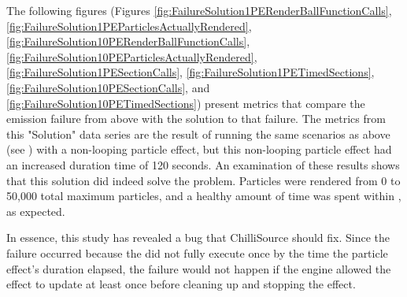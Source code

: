 The following figures (Figures \ref{fig:FailureSolution1PERenderBallFunctionCalls}, \ref{fig:FailureSolution1PEParticlesActuallyRendered}, \ref{fig:FailureSolution10PERenderBallFunctionCalls}, \ref{fig:FailureSolution10PEParticlesActuallyRendered}, \ref{fig:FailureSolution1PESectionCalls}, \ref{fig:FailureSolution1PETimedSections}, \ref{fig:FailureSolution10PESectionCalls}, and \ref{fig:FailureSolution10PETimedSections}) present metrics that compare the emission failure from above with the solution to that failure. The metrics from this "Solution" data series are the result of running the same scenarios as above (see ) with a non-looping particle effect, but this non-looping particle effect had an increased duration time of 120 seconds\footnotemark. An examination of these results shows that this solution did indeed solve the problem. Particles were rendered from 0 to 50,000 total maximum particles, and a healthy amount of time was spent within , as expected.


In essence, this study has revealed a bug that ChilliSource should fix. Since the failure occurred because the  did not fully execute once by the time the particle effect's duration elapsed, the failure would not happen if the engine allowed the effect to update at least once before cleaning up and stopping the effect.


